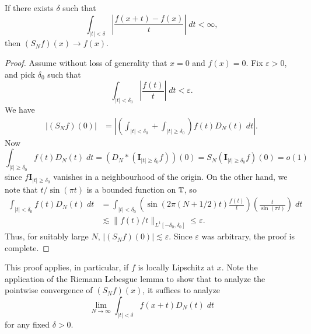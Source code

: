 \begin{theorem}
    If there exists $\delta$ such that
    \[ \int_{|t| < \delta} \left| \frac{f(x+t) - f(x)}{t} \right|\; dt < \infty, \]
    then $(S_N f)(x) \to f(x)$.
\end{theorem}
\begin{proof}
    Assume without loss of generality that $x = 0$ and $f(x) = 0$. Fix $\varepsilon > 0$, and pick $\delta_0$ such that
    \[ \int_{|t| < \delta_0} \left| \frac{f(t)}{t} \right|\; dt < \varepsilon. \]
    We have
    \begin{align*}
        |(S_N f)(0)| &= \left| \left( \int_{|t| < \delta_0} + \int_{|t| \geq \delta_0} \right) f(t) D_N(t)\; dt \right|.
    \end{align*}
    Now
    \[ \int_{|t| \geq \delta_0} f(t) D_N(t)\; dt = (D_N * \left( \mathbf{I}_{|t| \geq \delta_0} f \right))(0) = S_N( \mathbf{I}_{|t| \geq \delta_0} f )(0) = o(1) \]
    since $f \mathbf{I}_{|t| \geq \delta_0}$ vanishes in a neighbourhood of the origin. On the other hand, we note that $t/\sin(\pi t)$ is a bounded function on $\operatorname{\mathbb{T}}$, so
    \begin{align*}
        \int_{|t| < \delta_0} f(t) D_N(t)\; dt &= \int_{|t| < \delta_0} \left( \sin(2 \pi (N + 1/2)t) \frac{f(t)}{t} \right) \left( \frac{t}{\sin(\pi t)} \right)\; dt\\
        &\lesssim \| f(t)/t \|_{L^1[-\delta_0,\delta_0]} \leq \varepsilon.
    \end{align*}
    Thus, for suitably large $N$, $|(S_N f)(0)| \lesssim \varepsilon$. Since $\varepsilon$ was arbitrary, the proof is complete.
\end{proof}

This proof applies, in particular, if $f$ is locally Lipschitz at $x$. Note the application of the Riemann Lebesgue lemma to show that to analyze the pointwise convergence of $(S_N f)(x)$, it suffices to analyze
%
\[ \lim_{N \to \infty} \int_{|t| < \delta} f(x+t) D_N(t)\; dt \]
%
for any fixed $\delta > 0$.

